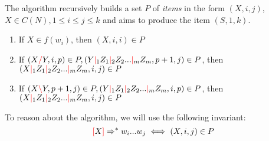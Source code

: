 \documentclass[12pt]{extarticle}
\theoremstyle{definition} \newtheorem{defn}{Definition}
\theoremstyle{definition} \newtheorem{prop}{Proposition}
\theoremstyle{definition} \newtheorem{property}{Property}
\newcommand{\lc}{\textcolor{red}{\backslash}}
\newcommand{\rc}{\textcolor{red}{/}}
\newcommand{\mc}{\textcolor{red}{|}}
\newcommand{\lb}{\textcolor{red}{[}}
\newcommand{\rb}{\textcolor{red}{]}}
\begin{document}
The algorithm recursively builds a set $P$ of \emph{items} in the form
$(X, i, j)$, $X \in C(N), 1 \leq i \leq j \leq k$ and aims to produce the item
$(S, 1, k)$.

\begin{enumerate}
    \item If $X \in f(w_i)$, then $(X, i, i) \in P$
    \item If $(X \rc Y, i, p) \in P, (Y \mc_1 Z_1 \mc_2 Z_2 ... \mc_m Z_m, p + 1, j) \in P$,
        then $(X \mc_1 Z_1 \mc_2 Z_2 ... \mc_m Z_m, i, j) \in P$
    \item If $(X \lc Y, p + 1, j) \in P, (Y \mc_1 Z_1 \mc_2 Z_2 ... \mc_m Z_m, i, p) \in P$,
        then $(X \mc_1 Z_1 \mc_2 Z_2 ... \mc_m Z_m, i, j) \in P$
\end{enumerate}

To reason about the algorithm, we will use the following invariant:
\begin{equation}
    \lb X \rb \Rightarrow^* w_i ... w_j \iff (X, i, j) \in P
\end{equation}
\end{document}
